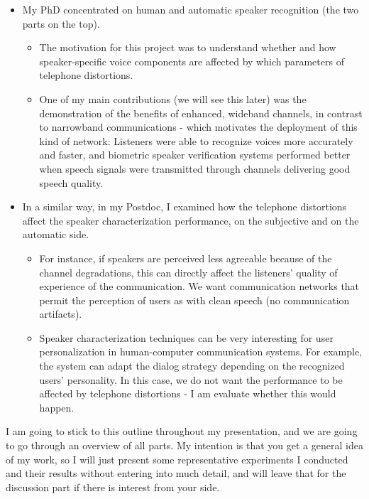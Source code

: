 \documentclass[a4paper]{article}
\begin{document}
\begin{itemize}
\item My PhD concentrated on human and automatic speaker recognition (the two parts on the top). 

\begin{itemize}
	
\item The motivation for this project was to understand whether and how speaker-specific voice components are affected by which parameters of telephone distortions. 

\item One of my main contributions (we will see this later) was the demonstration of the benefits of enhanced, wideband channels, in contrast to narrowband communications - which motivates the deployment of this kind of network: Listeners were able to recognize voices more accurately and faster, and biometric speaker verification systems performed better when speech signals were transmitted through channels delivering good speech quality.

\end{itemize}

\item In a similar way, in my Postdoc, I examined how the telephone distortions affect the speaker characterization performance, on the subjective and on the automatic side. 

\begin{itemize}
	
\item For instance, if speakers are perceived less agreeable because of the channel degradations, this can directly affect the listeners' quality of experience of the communication. We want communication networks that permit the perception of users as with clean speech (no communication artifacts).

\item Speaker characterization techniques can be very interesting for user personalization in human-computer communication systems. For example, the system can adapt the dialog strategy depending on the recognized users' personality. In this case, we do not want the performance to be affected by telephone distortions - I am evaluate whether this would happen.

\end{itemize}

\end{itemize}

I am going to stick to this outline throughout my presentation, and we are going to go through an overview of all parts. My intention is that you get a general idea of my work, so I will just present some representative experiments I conducted and their results without entering into much detail, and will leave that for the discussion part if there is interest from your side.
\end{document}
